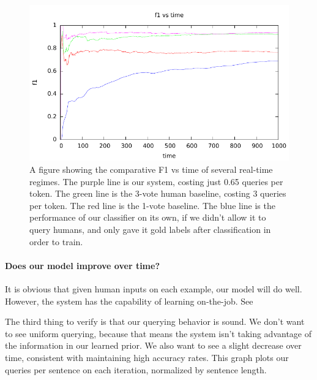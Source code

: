 \begin{figure}[t]
  \begin{centering}
  \includegraphics[width=1.0\textwidth]{figures/ner_2_class/f1_plot/f1_vs_time.pdf}
  \end{centering}
  \caption{A figure showing the comparative F1 vs time of several real-time regimes. The purple line is our system, costing just 0.65 queries per token. The green line is the 3-vote human baseline, costing 3 queries per token. The red line is the 1-vote baseline. The blue line is the performance of our classifier on its own, if we didn't allow it to query humans, and only gave it gold labels after classification in order to train.}
\label{fig:ner-running-f1}
\end{figure}


\paragraph{Does our model improve over time?}
It is obvious that given human inputs on each example, our model will do well.
However, the system has the capability of learning on-the-job.
See 

The third thing to verify is that our querying behavior is sound.
We don't want to see uniform querying, because that means the system isn't taking advantage of the information in our learned prior.
We also want to see a slight decrease over time, consistent with maintaining high accuracy rates.
This graph plots our queries per sentence on each iteration, normalized by sentence length.

